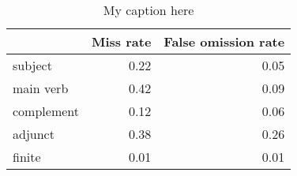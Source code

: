 \begin{table}[!ht]
\centering
\begin{tabular}{lrr}
\toprule
{} &  Miss rate &  False omission rate \\
\midrule
subject    &       0.22 &                 0.05 \\
main verb  &       0.42 &                 0.09 \\
complement &       0.12 &                 0.06 \\
adjunct    &       0.38 &                 0.26 \\
finite     &       0.01 &                 0.01 \\
\bottomrule
\end{tabular}
\caption{My caption here}
\label{tab:unit-elements-mood-combined-errors}
\end{table}